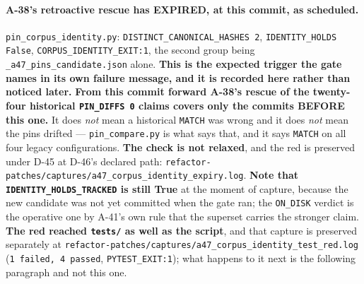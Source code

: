 \documentclass[
  10pt,
]{article}
\begin{document}
\paragraph{A-38's retroactive rescue has EXPIRED, at this commit, as scheduled.}
\texttt{pin\_corpus\_identity.py}: \texttt{DISTINCT\_CANONICAL\_HASHES 2}, \texttt{IDENTITY\_HOLDS False}, \texttt{CORPUS\_IDENTITY\_EXIT:1}, the second group being \texttt{\_a47\_pins\_candidate.json} alone. \textbf{This is the expected trigger the gate names in its own failure message, and it is recorded here rather than noticed later.} \textbf{From this commit forward A-38's rescue of the twenty-four historical \texttt{PIN\_DIFFS 0} claims covers only the commits BEFORE this one.} It does \emph{not} mean a historical \texttt{MATCH} was wrong and it does \emph{not} mean the pins drifted --- \texttt{pin\_compare.py} is what says that, and it says \texttt{MATCH} on all four legacy configurations. \textbf{The check is not relaxed}, and the red is preserved under D-45 at D-46's declared path: \texttt{refactor-patches/\allowbreak{}captures/\allowbreak{}a47\_corpus\_identity\_expiry.log}. \textbf{Note that \texttt{IDENTITY\_HOLDS\_TRACKED} is still True} at the moment of capture, because the new candidate was not yet committed when the gate ran; the \texttt{ON\_DISK} verdict is the operative one by A-41's own rule that the superset carries the stronger claim. \textbf{The red reached \texttt{tests/} as well as the script}, and that capture is preserved separately at \texttt{refactor-patches/\allowbreak{}captures/\allowbreak{}a47\_corpus\_identity\_test\_red.log} (\texttt{1 failed, 4 passed}, \texttt{PYTEST\_EXIT:1}); what happens to it next is the following paragraph and not this one.
\end{document}

